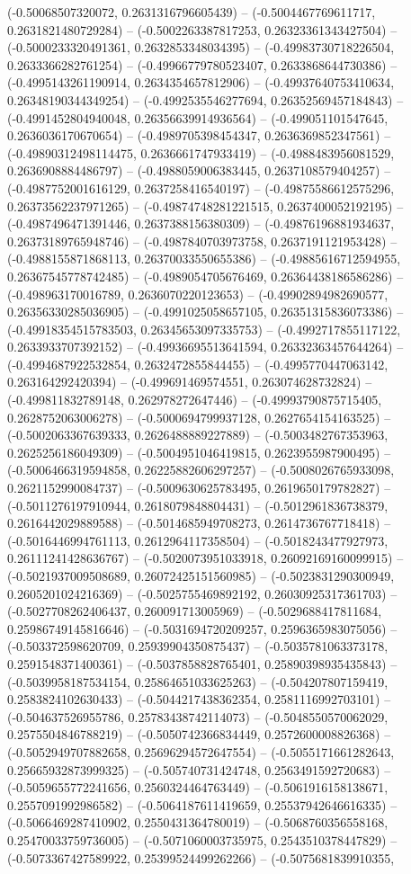 (-0.50068507320072, 0.2631316796605439) -- (-0.5004467769611717, 0.2631821480729284) -- (-0.5002263387817253, 0.26323361343427504) -- (-0.5000233320491361, 0.2632853348034395) -- (-0.49983730718226504, 0.2633366282761254) -- (-0.49966779780523407, 0.2633868644730386) -- (-0.4995143261190914, 0.2634354657812906) -- (-0.49937640753410634, 0.26348190344349254) -- (-0.4992535546277694, 0.26352569457184843) -- (-0.4991452804940048, 0.26356639914936564) -- (-0.499051101547645, 0.2636036170670654) -- (-0.4989705398454347, 0.2636369852347561) -- (-0.49890312498114475, 0.2636661747933419) -- (-0.4988483956081529, 0.2636908884486797) -- (-0.4988059006383445, 0.2637108579404257) -- (-0.4987752001616129, 0.2637258416540197) -- (-0.49875586612575296, 0.26373562237971265) -- (-0.49874748281221515, 0.2637400052192195) -- (-0.4987496471391446, 0.2637388156380309) -- (-0.49876196881934637, 0.26373189765948746) -- (-0.4987840703973758, 0.2637191121953428) -- (-0.4988155871868113, 0.26370033550655386) -- (-0.49885616712594955, 0.26367545778742485) -- (-0.4989054705676469, 0.26364438186586286) -- (-0.498963170016789, 0.2636070220123653) -- (-0.49902894982690577, 0.26356330285036905) -- (-0.4991025058657105, 0.26351315836073386) -- (-0.49918354515783503, 0.26345653097335753) -- (-0.4992717855117122, 0.2633933707392152) -- (-0.49936695513641594, 0.26332363457644264) -- (-0.4994687922532854, 0.2632472855844455) -- (-0.4995770447063142, 0.263164292420394) -- (-0.499691469574551, 0.263074628732824) -- (-0.499811832789148, 0.262978272647446) -- (-0.49993790875715405, 0.2628752063006278) -- (-0.5000694799937128, 0.2627654154163525) -- (-0.5002063367639333, 0.2626488889227889) -- (-0.5003482767353963, 0.2625256186049309) -- (-0.5004951046419815, 0.2623955987900495) -- (-0.5006466319594858, 0.26225882606297257) -- (-0.5008026765933098, 0.2621152990084737) -- (-0.5009630625783495, 0.2619650179782827) -- (-0.5011276197910944, 0.2618079848804431) -- (-0.5012961836738379, 0.2616442029889588) -- (-0.5014685949708273, 0.2614736767718418) -- (-0.5016446994761113, 0.2612964117358504) -- (-0.5018243477927973, 0.26111241428636767) -- (-0.5020073951033918, 0.26092169160099915) -- (-0.5021937009508689, 0.26072425151560985) -- (-0.5023831290300949, 0.2605201024216369) -- (-0.5025755469892192, 0.26030925317361703) -- (-0.5027708262406437, 0.260091713005969) -- (-0.5029688417811684, 0.25986749145816646) -- (-0.5031694720209257, 0.2596365983075056) -- (-0.503372598620709, 0.25939904350875437) -- (-0.5035781063373178, 0.2591548371400361) -- (-0.5037858828765401, 0.25890398935435843) -- (-0.5039958187534154, 0.25864651033625263) -- (-0.504207807159419, 0.2583824102630433) -- (-0.5044217438362354, 0.2581116992703101) -- (-0.504637526955786, 0.25783438742114073) -- (-0.5048550570062029, 0.2575504846788219) -- (-0.5050742366834449, 0.2572600008826368) -- (-0.5052949707882658, 0.25696294572647554) -- (-0.5055171661282643, 0.25665932873999325) -- (-0.505740731424748, 0.2563491592720683) -- (-0.5059655772241656, 0.2560324464763449) -- (-0.5061916158138671, 0.2557091992986582) -- (-0.5064187611419659, 0.25537942646616335) -- (-0.5066469287410902, 0.2550431364780019) -- (-0.5068760356558168, 0.25470033759736005) -- (-0.5071060003735975, 0.2543510378447829) -- (-0.5073367427589922, 0.25399524499262266) -- (-0.5075681839910355, 